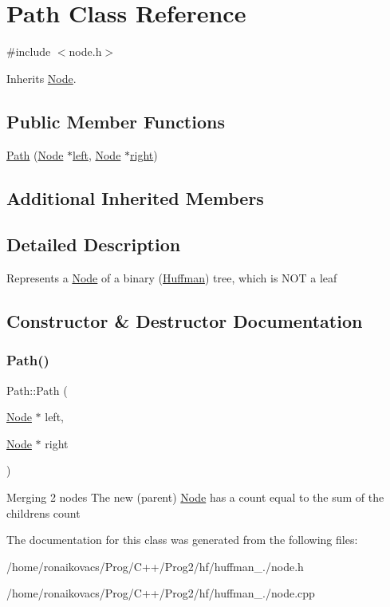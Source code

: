 \hypertarget{class_path}{}\section{Path Class Reference}
\label{class_path}


{\ttfamily \#include $<$node.\+h$>$}



Inherits \hyperlink{class_node}{Node}.

\subsection*{Public Member Functions}
\begin{DoxyCompactItemize}
\item 
\hyperlink{class_path_aa28e6f758fda57b632d8e0aed4ded033}{Path} (\hyperlink{class_node}{Node} $\ast$\hyperlink{class_node_af9438bd5c1df91946e72ee3f7f133a40}{left}, \hyperlink{class_node}{Node} $\ast$\hyperlink{class_node_a3eabc288cada601df9592ecf88d41220}{right})
\end{DoxyCompactItemize}
\subsection*{Additional Inherited Members}


\subsection{Detailed Description}
Represents a \hyperlink{class_node}{Node} of a binary (\hyperlink{class_huffman}{Huffman}) tree, which is N\+OT a leaf 

\subsection{Constructor \& Destructor Documentation}
\mbox{\label{class_path_aa28e6f758fda57b632d8e0aed4ded033}} 
\subsubsection{\texorpdfstring{Path()}{Path()}}
{\footnotesize\ttfamily Path\+::\+Path (\begin{DoxyParamCaption}\item[{\hyperlink{class_node}{Node} $\ast$}]{left,  }\item[{\hyperlink{class_node}{Node} $\ast$}]{right }\end{DoxyParamCaption})}

Merging 2 nodes The new (parent) \hyperlink{class_node}{Node} has a count equal to the sum of the children\textquotesingle{}s count 

The documentation for this class was generated from the following files\+:\begin{DoxyCompactItemize}
\item 
/home/ronaikovacs/\+Prog/\+C++/\+Prog2/hf/huffman\+\_./node.\+h\item 
/home/ronaikovacs/\+Prog/\+C++/\+Prog2/hf/huffman\+\_./node.\+cpp\end{DoxyCompactItemize}

